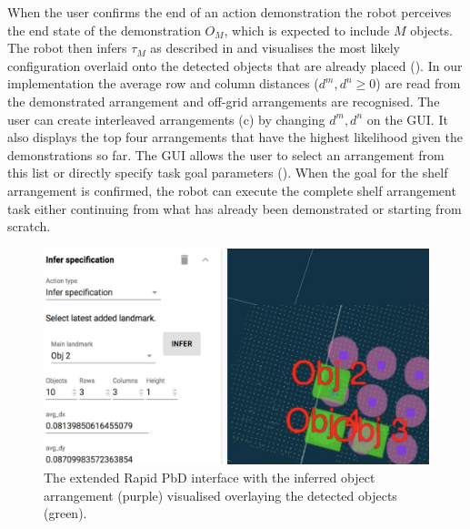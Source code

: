When the user confirms the end of an action demonstration the robot perceives the end state of the demonstration $O_M$, which is expected to include $M$ objects.
The robot then infers $\tau_M$ as described in  and visualises the most likely configuration overlaid onto the detected objects that are already placed ().
In our implementation the average row and column distances ($d^m, d^n \geq 0$) are read from the demonstrated arrangement and off-grid arrangements are recognised.
The user can create interleaved arrangements (c) by changing $d^m, d^n$ on the GUI.
It also displays the top four arrangements that have the highest likelihood given the demonstrations so far.
The GUI allows the user to select an arrangement from this list or directly specify task goal parameters ().
When the goal for the shelf arrangement is confirmed, the robot can execute the complete shelf arrangement task either continuing from what has already been demonstrated or starting from scratch.



\begin{figure}
	\includegraphics[width=0.8\linewidth]{figures/gui-iros}
	\caption{The extended Rapid PbD interface with the inferred object arrangement (purple) visualised overlaying the detected objects (green).}
	\label{fig:gui}
\end{figure}


